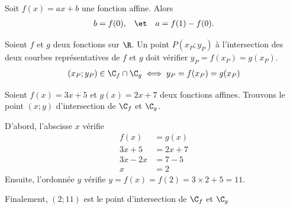\begin{thm}\label{thm:2}
	Soit $f(x) = ax+b$ une fonction affine.
	Alors
		\begin{align*}
			b = f(0), && \et && a = f(1) - f(0).
		\end{align*}
\end{thm}


\begin{thm}
	Soient $f$ et $g$ deux fonctions sur $\R$.
	Un point $P(x_P; y_P)$ à l'intersection des deux courbes représentatives de $f$ et $g$ doit vérifier $y_P = f(x_P) = g(x_P)$.
		\begin{align*}
			(x_P ; y_P) \in \C_f \cap \C_g \iff y_P = f(x_P) = g(x_P)
		\end{align*}
\end{thm}



\begin{exemple}
	Soient $f(x) = 3x + 5$ et $g(x) = 2x + 7$ deux fonctions affines.
	Trouvons le point $(x;y)$ d'intersection de $\C_f$ et $\C_g$.
	
	D'abord, l'abscisse $x$ vérifie
		\begin{align*}
			f(x) &= g(x) \\
			3x+5 &= 2x+7 \\
			3x-2x &= 7 - 5 \\
			x &= 2
		\end{align*}
	Ensuite, l'ordonnée $y$ vérifie $y=f(x) = f(2) = 3\times2+5 = 11$.
	
	Finalement, $(2 ; 11)$ est le point d'intersection de $\C_f$ et $\C_g$
\end{exemple}

